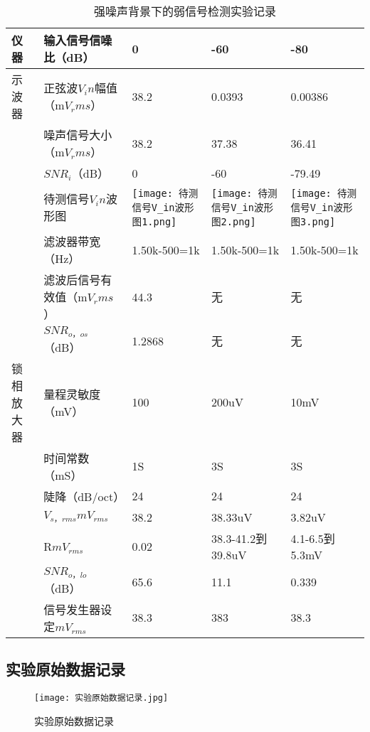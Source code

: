 \documentclass[dvipsnames, svgnames,a4paper,11pt]{article}
\begin{document}
		\begin{table}[ht]
			\centering
				\begin{tabularx}{\textwidth}{|X|X|X|X|X|}
					\hline
					仪器 & 输入信号信噪比（dB） & 0 & -60 & -80 \\
					\hline
					示波器 & 正弦波$V_in$幅值（m$V_rms$） & 38.2 & 0.0393 &0.00386\\
					\hline
					& 噪声信号大小（m$V_rms$）& 38.2 & 37.38&36.41 \\
					\hline
					& $SNR_i$（dB）&0  & -60&-79.49 \\
					\hline
					& 待测信号$V_in$波形图&\texttt{[image: 待测信号V\_in波形图1.png]}  & \texttt{[image: 待测信号V\_in波形图2.png]}&\texttt{[image: 待测信号V\_in波形图3.png]}\\
					\hline
					& 滤波器带宽（Hz）&1.50k-500=1k & 1.50k-500=1k &1.50k-500=1k  \\
					\hline
					& 滤波后信号有效值（m$V_rms$）&44.3 & 无 &无  \\
					\hline
					& $SNR_{o，os}$（dB）&1.2868 & 无 &无  \\
					\hline
					锁相放大器& 量程灵敏度（mV）&100& 200uV &10mV  \\
					\hline
					&时间常数（mS）&1S& 3S &3S \\
					\hline
					&陡降（dB/oct）&24&24 &24\\
					\hline
					&$V_{s，rms}$$mV_{rms}$&38.2& 38.33uV&3.82uV\\
					\hline
					&R$mV_{rms}$&0.02& 38.3-41.2到 39.8uV&4.1-6.5到5.3mV\\
					\hline
					&$SNR_{o，lo}$（dB）&65.6&11.1&0.339\\
					\hline
					&信号发生器设定$mV_{rms}$&38.3&383&38.3\\
					\hline	
				\end{tabularx}
			\caption{强噪声背景下的弱信号检测实验记录}
			\label{tab:强噪声背景下的弱信号检测}
		\end{table}

\subsection{实验原始数据记录}
	\begin{figure}[htbp]
			\centering
			\texttt{[image: 实验原始数据记录.jpg]}
			\caption{实验原始数据记录}
			\label{fig:实验原始数据记录}
	\end{figure}
\end{document}
